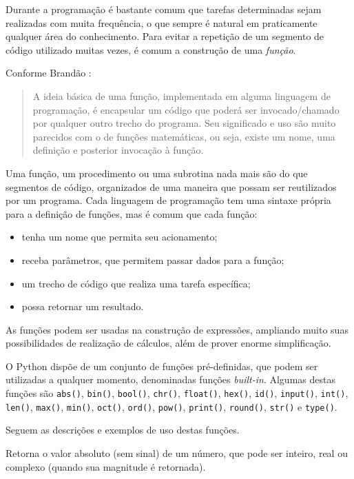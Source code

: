 \documentclass[
]{book}
\providecommand{\tightlist}{%
  \setlength{\itemsep}{0pt}\setlength{\parskip}{0pt}}
\begin{document}
Durante a programação é bastante comum que tarefas determinadas sejam realizadas com muita frequência, o que sempre é natural em praticamente qualquer área do conhecimento. Para evitar a repetição de um segmento de código utilizado muitas vezes, é comum a construção de uma \emph{função}.

Conforme Brandão \citep{bra2021}:

\begin{quote}
A ideia básica de uma função, implementada em alguma linguagem de programação, é encapsular um código que poderá ser invocado/chamado por qualquer outro trecho do programa. Seu significado e uso são muito parecidos com o de funções matemáticas, ou seja, existe um nome, uma definição e posterior invocação à função.
\end{quote}

Uma função, um procedimento ou uma subrotina nada mais são do que segmentos de código, organizados de uma maneira que possam ser reutilizados por um programa. Cada linguagem de programação tem uma sintaxe própria para a definição de funções, mas é comum que cada função:

\begin{itemize}
\tightlist
\item
  tenha um nome que permita seu acionamento;
\item
  receba parâmetros, que permitem passar dados para a função;
\item
  um trecho de código que realiza uma tarefa específica;
\item
  possa retornar um resultado.
\end{itemize}

As funções podem ser usadas na construção de expressões, ampliando muito suas possibilidades de realização de cálculos, além de prover enorme simplificação.

O Python dispõe de um conjunto de funções pré-definidas, que podem ser utilizadas a qualquer momento, denominadas funções \emph{built-in}. Algumas destas funções são \texttt{abs()}, \texttt{bin()}, \texttt{bool()}, \texttt{chr()}, \texttt{float()}, \texttt{hex()}, \texttt{id()}, \texttt{input()}, \texttt{int()}, \texttt{len()}, \texttt{max()}, \texttt{min()}, \texttt{oct()}, \texttt{ord()}, \texttt{pow()}, \texttt{print()}, \texttt{round()}, \texttt{str()} e \texttt{type()}.

Seguem as descrições e exemplos de uso destas funções.

\begin{description}
\tightlist
\item[\texttt{abs(x)}]
Retorna o valor absoluto (sem sinal) de um número, que pode ser inteiro, real ou complexo (quando sua magnitude é retornada).
\end{description}
\end{document}
